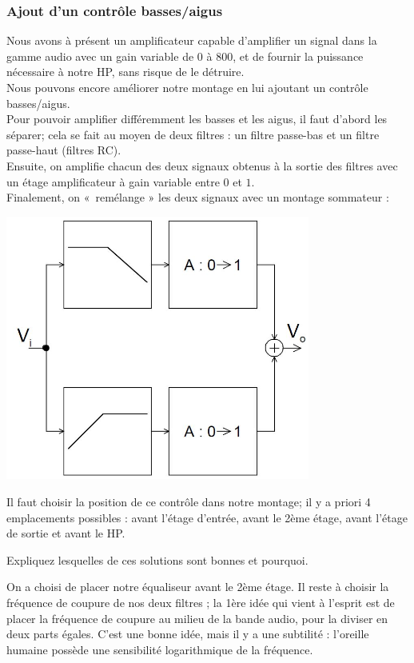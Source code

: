 \documentclass{../template/labo}
\begin{document}
\subsubsection{Ajout d'un contrôle basses/aigus}
Nous avons à présent un amplificateur capable d'amplifier un signal dans la gamme audio avec un gain variable de $0$ à $800$, et de fournir la puissance nécessaire à notre HP, sans risque de le détruire.\\
Nous pouvons encore améliorer notre montage en lui ajoutant un contrôle basses/aigus.\\
Pour pouvoir amplifier différemment les basses et les aigus, il faut d'abord les séparer; cela se fait au moyen de deux filtres : un filtre passe-bas et un filtre passe-haut (filtres RC).\\
Ensuite, on amplifie chacun des deux signaux obtenus à la sortie des filtres avec un étage amplificateur à gain variable entre $0$ et $1$.\\
Finalement, on « remélange » les deux signaux avec un montage sommateur :
\begin{center}
\includegraphics[width=10cm]{figures/AOPsommateur}
\end{center}

Il faut choisir la position de ce contrôle dans notre montage; il y a priori 4 emplacements possibles : avant l'étage d'entrée, avant le 2ème étage, avant l'étage de sortie et avant le HP.

\Question
{
Expliquez lesquelles de ces solutions sont bonnes et pourquoi.
}
{}

On a choisi de placer notre équaliseur avant le 2ème étage.
Il reste à choisir la fréquence de coupure de nos deux filtres ; la 1ère idée qui vient à l'esprit est de placer la fréquence de coupure au milieu de la bande audio, pour la diviser en deux parts égales.
C'est une bonne idée, mais il y a une subtilité : l'oreille humaine possède une sensibilité logarithmique de la fréquence.
\end{document}
